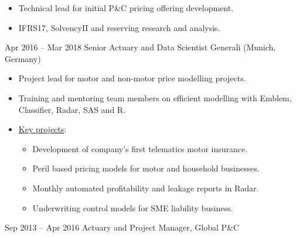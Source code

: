 \documentclass[a4paper,]{fortysecondscv}
\begin{document}
\begin{cvtable}
    {
        \vspace{-\topsep}
        \begin{itemize}[nosep, leftmargin=0pt] %
            \item Technical lead for initial P\&C pricing offering development.
            \item IFRS17, SolvencyII and reserving research and analysis.
        \end{itemize}
    }
    \vspace{\topsep}
    \cvitem
    {Apr 2016 -- Mar 2018}
    {Senior Actuary and Data Scientist}
    {Generali (Munich, Germany)}
    {
        \vspace{-\topsep}
        \begin{itemize}[nosep, leftmargin=0pt] %
            \item Project lead for motor and non-motor price modelling projects.
            \item Training and mentoring team members on efficient modelling with Emblem, Classifier, Radar, SAS and R.
            \item \underline{Key projects}:
                  \begin{itemize}
                      \item Development of company's first telematics motor insurance.
                      \item Peril based pricing models for motor and household businesses.
                      \item Monthly automated profitability and leakage reports in Radar.
                      \item Underwriting control models for SME liability business.
                  \end{itemize}
        \end{itemize}
    }
    \vspace{\topsep}
    \cvitem
    {Sep 2013 -- Apr 2016}
    {Actuary and Project Manager, Global P\&C}

\end{cvtable}
\end{document}
